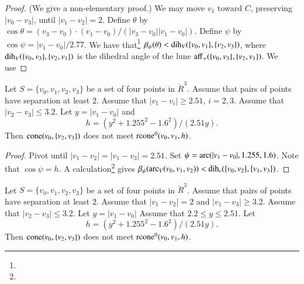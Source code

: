 
\begin{proof} (We give a non-elementary proof.)  We may
move $v_1$ toward $C$, preserving $|v_0-v_3|$, until $|v_1-v_2|=2$.
Define $\theta$ by $\cos\theta = (v_3-v_0)\cdot (v_1-v_0)/(|v_3-v_0||v_1-v_0|)$.
Define $\psi$ by $\cos\psi = |v_1-v_0|/2.77$.
We have that\footnote{}
    $\beta_\psi(\theta) < \operatorname{dih}_V(\{v_0,v_1\},\{v_2,v_3\})$,
where $\operatorname{dih}_V(\{v_0,v_3\},\{v_2,v_1\})$ is the dihedral angle 
of the lune ${\operatorname{aff}}_+(\{v_0,v_3\},\{v_2,v_1\})$.   We use
\end{proof}
\newpage

\begin{lemma}
Let $S=\{v_0,v_1,v_2,v_3\}$ be a set of four points in $\ring{R}^3$.
Assume that pairs of points have separation at least $2$.
Assume that
$|v_1-v_i|\ge 2.51$, $i=2,3$.
Assume that $|v_2-v_3|\le 3.2$.
Let $y = |v_1-v_0|$ and 
$$
  h=(y^2+1.255^2-1.6^2)/(2.51 y).
$$
Then ${\operatorname{cone}}(v_0,\{v_2,v_3\})$ does not meet
${\operatorname{rcone}}^0(v_0,v_1,h)$.
\end{lemma}


\begin{proof}  Pivot until
$|v_1-v_2|=|v_1-v_3|=2.51$.   
Set
$\psi=\operatorname{arc}(|v_1-v_0|,1.255,1.6)$.  Note that $\cos\psi=h$.
A calculation\footnote{} %
gives $\beta_\psi(\operatorname{arc}_V(v_0,v_1,v_2))<\operatorname{dih}_v(\{v_0,v_2\},\{v_1,v_3\})$.
\end{proof}
\newpage

\begin{lemma} 
Let $S=\{v_0,v_1,v_2,v_3\}$ be a set of four points in $\ring{R}^3$.
Assume that pairs of points have separation at least $2$.
Assume that
$|v_1-v_2|=2$ and $|v_1-v_3|\ge3.2$.
Assume that $|v_2-v_3|\le 3.2$. Let $y = |v_1-v_0|$
Assume that $2.2\le y\le 2.51$.
Let
$$
  h= (y^2+1.255^2-1.6^2)/(2.51 y).
$$
Then ${\operatorname{cone}}(v_0,\{v_2,v_3\})$ does not meet
${\operatorname{rcone}}^0(v_0,v_1,h)$.
\end{lemma}


